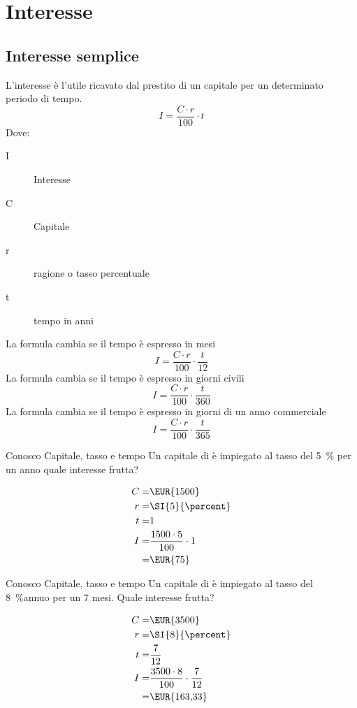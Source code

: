 \chapter{Interesse}
\section{Interesse semplice}
L'interesse è l'utile ricavato dal prestito di un capitale per un determinato periodo di tempo.
\[I=\dfrac{C\cdot r}{100}\cdot t\]
Dove:\begin{description}
	\item[I] Interesse
	\item[C] Capitale
	\item[r] ragione o tasso percentuale
	\item[t] tempo in anni
\end{description}
La formula cambia se il tempo è espresso in mesi
\[I=\dfrac{C\cdot r}{100}\cdot \dfrac{t}{12}\]
La formula cambia se il tempo è espresso in giorni civili
\[I=\dfrac{C\cdot r}{100}\cdot \dfrac{t}{360}\]
La formula cambia se il tempo è espresso in giorni di un anno commerciale
\[I=\dfrac{C\cdot r}{100}\cdot \dfrac{t}{365}\]
	\begin{esempiot}{Conosco Capitale, tasso e tempo}{}
Un capitale di  è impiegato al tasso del \SI{5}{\percent} per un anno quale interesse frutta?
\end{esempiot}
\begin{align*}
	C=&\mbox{\EUR{1500}}\\
	r=&\SI{5}{\percent} \\
	t=&1\\
	I=&\dfrac{1500\cdot 5}{100}\cdot 1\\
	=&\mbox{\EUR{75}}\\
\end{align*}
	\begin{esempiot}{Conosco Capitale, tasso e tempo}{}
	Un capitale di  è impiegato al tasso del \SI{8}{\percent}annuo  per un 7 mesi. Quale interesse frutta?
\end{esempiot}
\begin{align*}
	C=&\mbox{\EUR{3500}}\\
	r=&\SI{8}{\percent} \\
	t=&\dfrac{7}{12}\\
	I=&\dfrac{3500\cdot 8}{100}\cdot \dfrac{7}{12}\\
	=&\mbox{\EUR{163,33}}\\
\end{align*}
